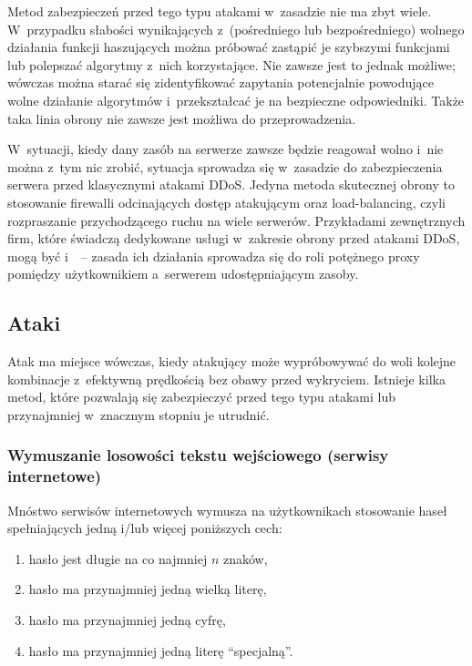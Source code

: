 Metod zabezpieczeń przed tego typu atakami w~zasadzie nie ma zbyt wiele.
W~przypadku słabości wynikających z~(pośredniego lub bezpośredniego) wolnego
działania funkcji haszujących można próbować zastąpić je szybszymi funkcjami
lub polepszać algorytmy z~nich korzystające. Nie zawsze jest to jednak możliwe;
wówczas można starać się zidentyfikować zapytania potencjalnie powodujące wolne
działanie algorytmów i~przekształcać je na bezpieczne odpowiedniki. Także taka
linia obrony nie zawsze jest możliwa do przeprowadzenia.

W~sytuacji, kiedy dany zasób na serwerze zawsze będzie reagował wolno i~nie
można z~tym nic zrobić, sytuacja sprowadza się w~zasadzie do zabezpieczenia
serwera przed klasycznymi atakami DDoS. Jedyna metoda skutecznej obrony to
stosowanie firewalli odcinających dostęp atakującym oraz load-balancing, czyli
rozpraszanie przychodzącego ruchu na wiele serwerów. Przykładami zewnętrznych
firm, które świadczą dedykowane usługi w~zakresie obrony przed atakami DDoS,
mogą być  i~~-- zasada ich działania sprowadza się do
roli potężnego proxy pomiędzy użytkownikiem a~serwerem udostępniającym zasoby.

\subsection{Ataki }

Atak  ma miejsce wówczas, kiedy atakujący może wypróbowywać do woli
kolejne kombinacje z~efektywną prędkością bez obawy przed wykryciem. Istnieje
kilka metod, które pozwalają się zabezpieczyć przed tego typu atakami lub
przynajmniej w~znacznym stopniu je utrudnić.

\subsubsection{Wymuszanie losowości tekstu wejściowego (serwisy internetowe)}
Mnóstwo serwisów internetowych wymusza na użytkownikach stosowanie haseł
spełniających jedną i/lub więcej poniższych cech:

\begin{enumerate}
\item hasło jest długie na co najmniej $n$ znaków,
\item hasło ma przynajmniej jedną wielką literę,
\item hasło ma przynajmniej jedną cyfrę,
\item hasło ma przynajmniej jedną literę ``specjalną''.
\end{enumerate}

